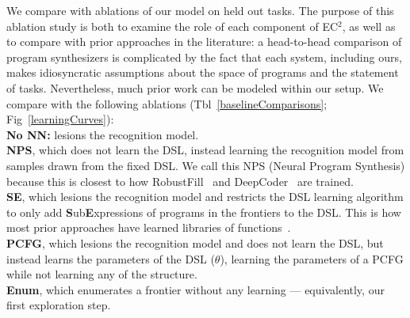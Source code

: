 \documentclass{article}
\newcommand{\systemEnding}{\textsc{EC$^2$}}
\begin{document}
We compare with ablations of our model on held out tasks.
The purpose of this ablation study is 
both to examine the role of each component of \systemEnding,
as well as to compare with
prior approaches in the literature:
a head-to-head
comparison of program synthesizers is complicated by the fact that
each system, including ours, makes idiosyncratic 
assumptions about the space of programs and the statement of tasks.
Nevertheless, much prior work can be modeled within our setup. 
We compare with the following ablations (Tbl~\ref{baselineComparisons};
Fig~\ref{learningCurves}):
\\\noindent \textbf{No NN:} lesions the recognition model.
\\\noindent \textbf{NPS}, which does not learn the DSL,
instead learning the recognition model
from samples drawn from the fixed DSL.
We call this NPS (Neural Program Synthesis)
because this is closest to how
RobustFill~\cite{devlin2017robustfill} and DeepCoder~\cite{balog2016deepcoder} are trained.
\\\noindent \textbf{SE}, which lesions the recognition model and restricts the DSL  learning algorithm to
only add \textbf{S}ub\textbf{E}xpressions of programs in the frontiers to the DSL. This is how most prior approaches have learned libraries of functions~\cite{Dechter:2013:BLV:2540128.2540316,DBLP:conf/icml/LiangJK10,DBLP:conf/ecai/LinDETM14}.
\\\noindent \textbf{PCFG}, which lesions the recognition model and does not learn the DSL,
but instead learns the parameters of the DSL ($\theta$), learning the parameters of a PCFG while not learning any of the structure.
\\\noindent \textbf{Enum}, which enumerates a frontier without any learning --- equivalently, our first exploration step.
\end{document}
